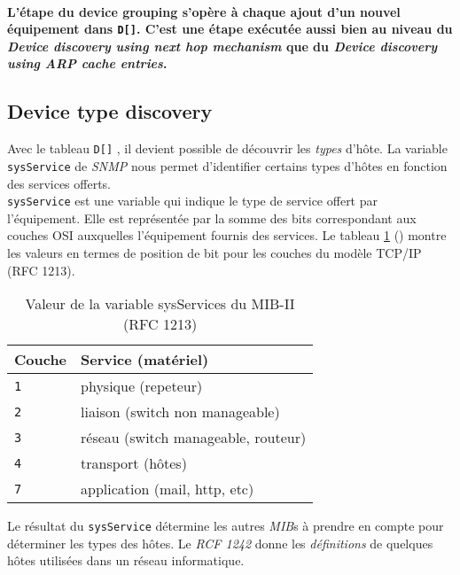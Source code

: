 \paragraph{L'étape du device grouping s'opère à chaque ajout d'un nouvel équipement dans \texttt{D[]}. C'est une étape exécutée aussi bien au niveau du \emph{Device discovery using next hop mechanism} que du \emph{Device discovery using ARP cache entries}.}


\subsection{Device type discovery}
Avec le tableau \texttt{D[]} , il devient possible de découvrir les \emph{types} d'hôte. La variable \texttt{sysService} de \emph{SNMP} nous permet d'identifier certains types d'hôtes en fonction des services offerts.\\
\texttt{sysService} est une variable qui indique le type de service offert par l'équipement. Elle est représentée par la somme des bits correspondant aux couches OSI auxquelles l'équipement fournis des services. Le tableau \ref{sysServices_mib} () montre les valeurs en termes de position de bit pour les couches du modèle TCP/IP (RFC 1213).
\begin{table}[h]
\begin{center}
 \caption{Valeur de la variable sysServices du  MIB-II (RFC 1213)} \label{sysServices_mib}
 \begin{tabular}{|l|l|}
 \hline
 \textbf{Couche} & \textbf{Service (matériel)} \\\hline
 \texttt{1} & physique (repeteur) \\\hline
 \texttt{2} & liaison (switch non manageable) \\\hline
 \texttt{3} & réseau (switch manageable, routeur) \\\hline
 \texttt{4} & transport (hôtes) \\\hline
 \texttt{7} & application (mail, http, etc) \\\hline
 \end{tabular}

\end{center}
\end{table}
Le résultat du \texttt{sysService} détermine les autres \emph{MIB}s à prendre en compte pour déterminer les types des hôtes. Le \emph{RCF 1242} donne les \emph{définitions} de quelques hôtes utilisées dans un réseau informatique.

